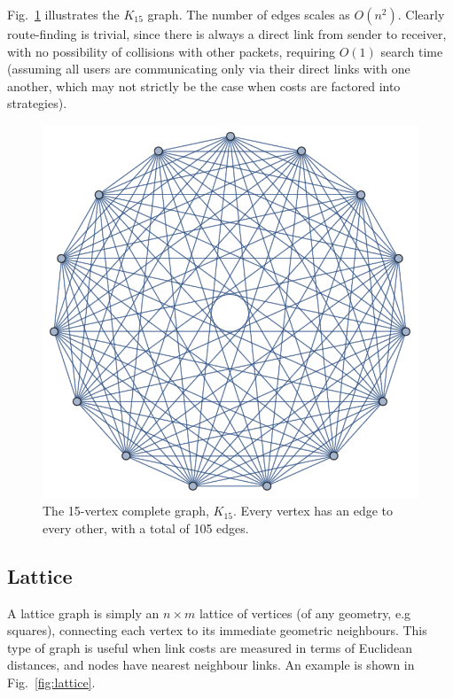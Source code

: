 \documentclass[aps,rmp,twocolumn,amsmath,amssymb,nofootinbib,superscriptaddress,longbibliography,floatfix,table-of-contents,eqsecnum]{revtex4-1}
\begin{document}
Fig.~\ref{fig:complete_graph} illustrates the $K_{15}$ graph. The number of edges scales as $O(n^2)$. Clearly route-finding is trivial, since there is always a direct link from sender to receiver, with no possibility of collisions with other packets, requiring $O(1)$ search time (assuming all users are communicating only via their direct links with one another, which may not strictly be the case when costs are factored into strategies).

\begin{figure}[!htb]
\includegraphics[width=0.7\columnwidth]{K_15}
\caption{The 15-vertex complete graph, $K_{15}$. Every vertex has an edge to every other, with a total of 105 edges.} \label{fig:complete_graph}
\end{figure}

%
%

\subsection{Lattice} 

A lattice graph is simply an \mbox{$n\times m$} lattice of vertices (of any geometry, e.g squares), connecting each vertex to its immediate geometric neighbours. This type of graph is useful when link costs are measured in terms of Euclidean distances, and nodes have nearest neighbour links. An example is shown in Fig.~\ref{fig:lattice}.
\end{document}
